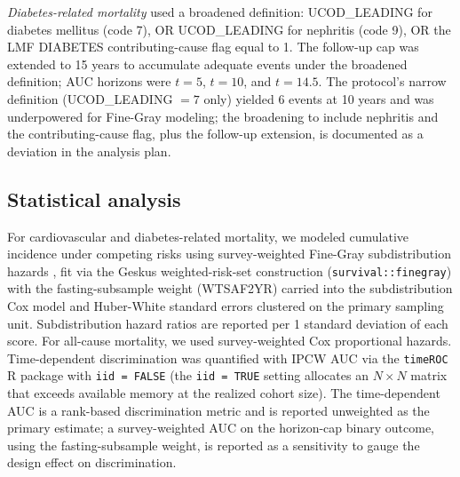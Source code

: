 \documentclass[11pt]{article}
\begin{document}
\emph{Diabetes-related mortality} used a broadened definition: UCOD\_LEADING for diabetes mellitus (code 7), OR UCOD\_LEADING for nephritis (code 9), OR the LMF DIABETES contributing-cause flag equal to 1. The follow-up cap was extended to 15 years to accumulate adequate events under the broadened definition; AUC horizons were $t = 5$, $t = 10$, and $t = 14.5$. The protocol's narrow definition (UCOD\_LEADING $= 7$ only) yielded 6 events at 10 years and was underpowered for Fine-Gray modeling; the broadening to include nephritis and the contributing-cause flag, plus the follow-up extension, is documented as a deviation in the analysis plan.

\subsection*{Statistical analysis}

For cardiovascular and diabetes-related mortality, we modeled cumulative incidence under competing risks using survey-weighted Fine-Gray subdistribution hazards \citep{finegray1999}, fit via the Geskus weighted-risk-set construction (\texttt{survival::finegray}) with the fasting-subsample weight (WTSAF2YR) carried into the subdistribution Cox model and Huber-White standard errors clustered on the primary sampling unit. Subdistribution hazard ratios are reported per 1 standard deviation of each score. For all-cause mortality, we used survey-weighted Cox proportional hazards. Time-dependent discrimination was quantified with IPCW AUC \citep{blanche2013ipcwauc} via the \texttt{timeROC} R package with \texttt{iid = FALSE} (the \texttt{iid = TRUE} setting allocates an $N \times N$ matrix that exceeds available memory at the realized cohort size). The time-dependent AUC is a rank-based discrimination metric and is reported unweighted as the primary estimate; a survey-weighted AUC on the horizon-cap binary outcome, using the fasting-subsample weight, is reported as a sensitivity to gauge the design effect on discrimination.
\end{document}
